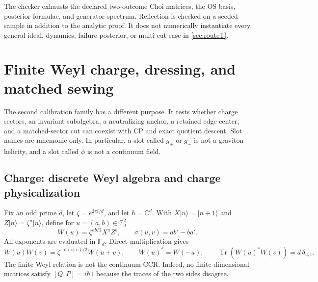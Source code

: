 \documentclass[11pt,a4paper]{article}
\theoremstyle{definition}
\theoremstyle{remark}
\newcommand{\C}{\mathbb C}
\newcommand{\Fd}{\mathbb F_d}
\newcommand{\Tr}{\operatorname{Tr}}
\newcommand{\ket}[1]{\lvert #1\rangle}
\begin{document}
The checker exhausts the declared two-outcome Choi matrices, the OS basis, posterior
formulae, and generator spectrum.  Reflection is checked on a seeded sample in addition
to the analytic proof.  It does not numerically instantiate every general ideal,
dynamics, failure-posterior, or multi-cut case in \cref{sec:routeT}.

\section{Finite Weyl charge, dressing, and matched sewing}
\label{sec:adsfinite}

The second calibration family has a different purpose.  It tests whether charge
sectors, an invariant subalgebra, a neutralizing anchor, a retained edge center, and a
matched-sector cut can coexist with CP and exact quotient descent.  Slot names are
mnemonic only.  In particular, a slot called $g_+$ or $g_-$ is not a graviton helicity,
and a slot called $\phi$ is not a continuum field.

\subsection{Charge: discrete Weyl algebra and charge physicalization}

Fix an odd prime $d$, let $\zeta=e^{2\pi i/d}$, and let $h=\C^d$.  With
$X\ket n=\ket{n+1}$ and $Z\ket n=\zeta^n\ket n$, define for
$u=(a,b)\in\Fd^2$
\begin{equation}
 W(u)=\zeta^{ab/2}X^aZ^b,\qquad
 \sigma(u,v)=ab'-ba'.
 \label{eq:weyl-def}
\end{equation}
All exponents are evaluated in $\Fd$.  Direct multiplication gives
\begin{equation}
 W(u)W(v)=\zeta^{-\sigma(u,v)/2}W(u+v),\qquad
 W(u)^*=W(-u),\qquad
 \Tr(W(u)^*W(v))=d\,\delta_{u,v}.
 \label{eq:weyl-laws}
\end{equation}
The finite Weyl relation is not the continuum CCR.  Indeed, no finite-dimensional
matrices satisfy $[Q,P]=i\hbar1$ because the traces of the two sides disagree.
\end{document}
